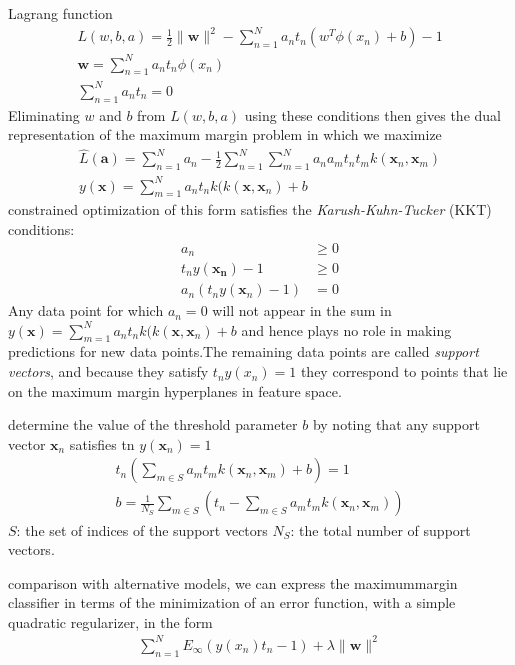 \documentclass[a4paper]{article}
\begin{document}
Lagrang function
\begin{align}
L(w,b,a) = \frac{1}{2}\|\mathbf{w}\|^2 - \sum_{n=1}^{N}
  a_n{t_n(w^T\phi(x_n)+b) -1}\\
\mathbf{w} = \sum_{n=1}^{N}  a_nt_n\phi(x_n)\\
\sum_{n=1}^{N}  a_nt_n = 0
\end{align}
Eliminating $w$ and $b$ from $L(w, b, a)$ using these conditions then
gives the dual representation of the maximum margin problem in which we maximize
\begin{align}
\widehat{L}(\mathbf{a}) = \sum_{n=1}^{N}  a_n - \frac{1}{2}
  \sum_{n=1}^N\sum_{m=1}^N a_na_mt_nt_m k(\mathbf{x}_n,\mathbf{x}_m)\\
y(\mathbf{x}) = \sum_{m=1}^N a_nt_nk(k(\mathbf{x},\mathbf{x}_n)+b
\end{align}
constrained optimization of this form satisfies the \textit{Karush-Kuhn-Tucker} (KKT) conditions:
\begin{align}
a_n &\geq 0\\
t_ny(\mathbf{x_n})-1 &\geq 0 \\
a_n(t_ny(\mathbf{x}_n)-1) & = 0
\end{align}
Any data point for which $a_n = 0$ will not appear in the sum in
$y(\mathbf{x}) = \sum_{m=1}^N a_nt_nk(k(\mathbf{x},\mathbf{x}_n)+b$
and hence plays no role in making predictions for new data points.The
remaining data points are called \textit{support vectors}, and because
they satisfy $t_n y(x_n) = 1$ they correspond to points that lie on
the maximum margin hyperplanes in feature space.

determine the value of the threshold parameter $b$ by noting that any
support vector $\mathbf{x}_n$ satisﬁes tn $y(\mathbf{x}_n) = 1$
\begin{align}
t_n (\sum_{m \in S} a_mt_mk(\mathbf{x}_n,\mathbf{x}_m) + b) = 1\\
b = \frac{1}{N_S}\sum_{m \in S} (t_n - \sum_{m \in S} a_mt_mk(\mathbf{x}_n,\mathbf{x}_m))
\end{align}
$S$: the set of indices of the support vectors
$N_S$: the total number of support vectors.

comparison with alternative models, we can express the maximummargin
classiﬁer in terms of the minimization of an error function, with a
simple quadratic regularizer, in the form
\begin{align}
\sum_{n=1}^N E_{\infty} (y(x_n)t_n - 1) + \lambda\|\mathbf{w}\|^2
\end{align}
\end{document}
